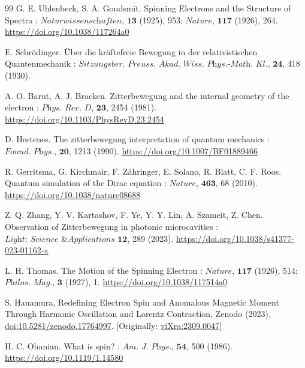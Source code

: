 \documentclass[%
 reprint,
 amsmath,amssymb,
 aps,
]{revtex4-1}
\numberwithin{equation}{section}%
\begin{document}
\begin{thebibliography}{99}
 G. E. Uhlenbeck, S. A. Goudsmit. Spinning Electrons and the Structure of Spectra : $\textit{Naturwissenschaften}$, $\textbf{13}$ (1925), 953; $\textit{Nature}$, $\textbf{117}$ (1926), 264. \href{https://doi.org/10.1038/117264a0}{https://doi.org/10.1038/117264a0}

 E. Schrödinger. Über die kräftefreie Bewegung in der relativistischen Quantenmechanik : $\textit{Sitzungsber. Preuss. Akad. Wiss. Phys.-Math. Kl.}$, $\textbf{24}$, 418 (1930).

 A. O. Barut, A. J. Bracken. Zitterbewegung and the internal geometry of the electron : $\textit{Phys. Rev. D}$, $\textbf{23}$, 2454 (1981). \href{https://doi.org/10.1103/PhysRevD.23.2454}{https://doi.org/10.1103/PhysRevD.23.2454}

 D. Hestenes. The zitterbewegung interpretation of quantum mechanics : $\textit{Found. Phys.}$, $\textbf{20}$, 1213 (1990). \href{https://doi.org/10.1007/BF01889466}{https://doi.org/10.1007/BF01889466}

 R. Gerritsma, G. Kirchmair, F. Zähringer, E. Solano, R. Blatt, C. F. Roos. Quantum simulation of the Dirac equation : $\textit{Nature}$, $\textbf{463}$, 68 (2010). \href{https://doi.org/10.1038/nature08688}{https://doi.org/10.1038/nature08688}

 Z. Q. Zhang, Y. V. Kartashov, F. Ye, Y. Y. Lin, A. Szameit, Z. Chen. 
Observation of Zitterbewegung in photonic microcavities : 
$\textit{Light: Science \& Applications}$ $\textbf{12}$, 289 (2023). \href{https://doi.org/10.1038/s41377-023-01162-x}{https://doi.org/10.1038/s41377-023-01162-x}

 L. H. Thomas. The Motion of the Spinning Electron : $\textit{Nature}$, $\textbf{117}$ (1926), 514; $\textit{Philos. Mag.}$, $\textbf{3}$ (1927), 1. \href{https://doi.org/10.1038/117514a0}{https://doi.org/10.1038/117514a0}

S. Hanamura, Redefining Electron Spin and Anomalous Magnetic Moment Through Harmonic Oscillation and Lorentz Contraction, Zenodo (2023), \href{https://doi.org/10.5281/zenodo.17764997}{doi:10.5281/zenodo.17764997}. [Originally: \href{https://vixra.org/abs/2309.0047}{viXra:2309.0047}]

 H. C. Ohanian. What is spin? : $\textit{Am. J. Phys.}$, $\textbf{54}$, 500 (1986). \href{https://doi.org/10.1119/1.14580}{https://doi.org/10.1119/1.14580}


\end{thebibliography}
\end{document}

